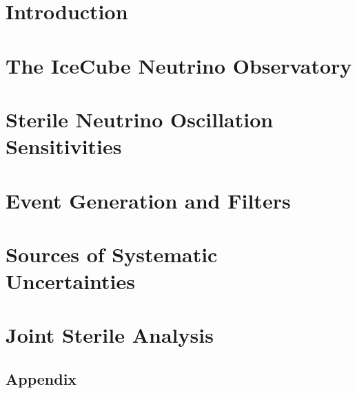 \documentclass[
11pt, 
english, 
doublespacing, %
headsepline, %
usenames,dvipsnames
]{dissertation_class} %
\numberwithin{figure}{section}
\numberwithin{table}{section}
\numberwithin{equation}{section}
\begin{document}
\tableofcontents


\chapter{Introduction}\label{chapter:intro}



\chapter{The IceCube Neutrino Observatory}\label{chapter:icecube}



\chapter{Sterile Neutrino Oscillation Sensitivities}\label{chapter:sense}


\chapter{Event Generation and Filters}\label{chapter:gen}



\chapter{Sources of Systematic Uncertainties}\label{chapter:unc}



\chapter{Joint Sterile Analysis}\label{chapter:res}

% 

% 


\begin{appendices}

    \chapter{Appendix}\label{chapter:appendix}
    
    
\end{appendices}

\end{document}

